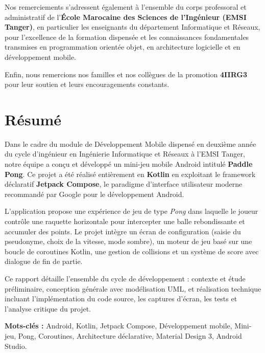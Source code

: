 \documentclass[12pt,a4paper]{report}
\begin{document}
Nos remerciements s'adressent \'egalement \`a l'ensemble du corps professoral et administratif de l'\textbf{\'Ecole Marocaine des Sciences de l'Ing\'enieur (EMSI Tanger)}, en particulier les enseignants du d\'epartement Informatique et R\'eseaux, pour l'excellence de la formation dispens\'ee et les connaissances fondamentales transmises en programmation orient\'ee objet, en architecture logicielle et en d\'eveloppement mobile.

Enfin, nous remercions nos familles et nos coll\`egues de la promotion \textbf{4IIRG3} pour leur soutien et leurs encouragements constants.

\newpage

\chapter*{R\'esum\'e}

Dans le cadre du module de D\'eveloppement Mobile dispens\'e en deuxi\`eme ann\'ee du cycle d'ing\'enieur en Ing\'enierie Informatique et R\'eseaux \`a l'EMSI Tanger, notre \'equipe a con\c{c}u et d\'evelopp\'e un mini-jeu mobile Android intitul\'e \textbf{Paddle Pong}. Ce projet a \'et\'e r\'ealis\'e enti\`erement en \textbf{Kotlin} en exploitant le framework d\'eclaratif \textbf{Jetpack Compose}, le paradigme d'interface utilisateur moderne recommand\'e par Google pour le d\'eveloppement Android.

L'application propose une exp\'erience de jeu de type \textit{Pong} dans laquelle le joueur contr\^ole une raquette horizontale pour intercepter une balle rebondissante et accumuler des points. Le projet int\`egre un \'ecran de configuration (saisie du pseudonyme, choix de la vitesse, mode sombre), un moteur de jeu bas\'e sur une boucle de coroutines Kotlin, une gestion de collisions et un syst\`eme de score avec dialogue de fin de partie.

Ce rapport d\'etaille l'ensemble du cycle de d\'eveloppement : contexte et \'etude pr\'eliminaire, conception g\'en\'erale avec mod\'elisation UML, et r\'ealisation technique incluant l'impl\'ementation du code source, les captures d'\'ecran, les tests et l'analyse critique du projet.

\medskip
\noindent\textbf{Mots-cl\'es :} Android, Kotlin, Jetpack Compose, D\'eveloppement mobile, Mini-jeu, Pong, Coroutines, Architecture d\'eclarative, Material Design 3, Android Studio.

\newpage
\end{document}
